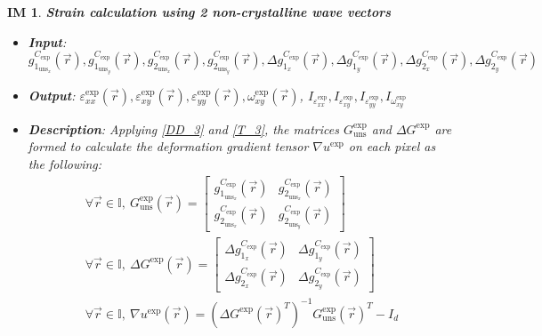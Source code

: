 \documentclass[12pt]{article}
\newtheorem{IM}{IM}
\begin{document}
\begin{IM}
\label{IM_5}
\noindent\colorbox{shadecolorIM}{\normalfont \textbf{Strain calculation using 2 non-crystalline wave vectors}}
\normalfont
\begin{itemize}
\item \textbf{Input}: $g_{1_{{\text{uns}}_x}}^{C_{\text{exp}}}(\vec{r}), g_{1_{{\text{uns}}_y}}^{C_{\text{exp}}}(\vec{r}),g_{2_{{\text{uns}}_x}}^{C_{\text{exp}}}(\vec{r}), g_{2_{{\text{uns}}_y}}^{C_{\text{exp}}}(\vec{r}), \Delta g_{1_{x}}^{C_{\text{exp}}}(\vec{r}), \Delta g_{1_{y}}^{C_{\text{exp}}}(\vec{r}),\Delta g_{2_{x}}^{C_{\text{exp}}}(\vec{r}),\Delta g_{2_{y}}^{C_{\text{exp}}}(\vec{r})$
\item \textbf{Output}: $\varepsilon_{\mathit{xx}}^{\text{exp}}(\vec{r}),\varepsilon_{\mathit{xy}}^{\text{exp}}(\vec{r}),\varepsilon_{\mathit{yy}}^{\text{exp}}(\vec{r}),\omega_{\mathit{xy}}^{\text{exp}}(\vec{r})$, $I_{\varepsilon_{\mathit{xx}}^{\text{exp}}},I_{\varepsilon_{\mathit{xy}}^{\text{exp}}},I_{\varepsilon_{\mathit{yy}}^{\text{exp}}},I_{\omega_{\mathit{xy}}^{\text{exp}}}$
\item \textbf{Description}: Applying \cref{DD_3} and \cref{T_3}, the matrices $G_{\text{uns}}^{\text{exp}}$ and $\Delta G^{\text{exp}}$ are formed to calculate the deformation gradient tensor $\nabla u^{\text{exp}}$ on each pixel as the following:
\begin{equation}
\begin{gathered}
\forall \vec{r} \in \mathbb{I}, \ G_{\text{uns}}^{\text{exp}}(\vec{r}) =
	\begin{bmatrix}
	g_{1_{{\text{uns}}_x}}^{C_{\text{exp}}}(\vec{r}) & g_{2_{{\text{uns}}_x}}^{C_{\text{exp}}}(\vec{r}) \\
	g_{2_{{\text{uns}}_x}}^{C_{\text{exp}}}(\vec{r}) & g_{2_{{\text{uns}}_y}}^{C_{\text{exp}}}(\vec{r}) 
	\end{bmatrix} \\
\forall \vec{r} \in \mathbb{I}, \	\Delta G^{\text{exp}}(\vec{r})=
	\begin{bmatrix}
	\Delta g_{1_{x}}^{C_{\text{exp}}}(\vec{r}) & \Delta g_{1_{y}}^{C_{\text{exp}}}(\vec{r}) \\
	\Delta g_{2_{x}}^{C_{\text{exp}}}(\vec{r}) & \Delta g_{2_{y}}^{C_{\text{exp}}}(\vec{r})
	\end{bmatrix} \\
\forall \vec{r} \in \mathbb{I}, \	\nabla u^{\text{exp}}(\vec{r}) = ({{\Delta G^{\text{exp}}}(\vec{r})}^{T})^{-1}{{G_{\text{uns}}^{\text{exp}}}(\vec{r})}^{T}-I_{d}
\end{gathered}

\end{equation}
\end{itemize}
\end{IM}
\end{document}
